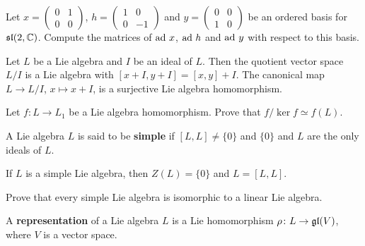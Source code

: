 \begin{exercise}
    Let $x=\begin{pmatrix}
        0&1\\
        0&0\end{pmatrix}$, $h=\begin{pmatrix}
        1&0\\
        0&-1\end{pmatrix}$ and $y=\begin{pmatrix}0&0\\1&0\end{pmatrix}$ 
        be an ordered basis for $\mathfrak{sl}(2,\mathbb{C})$. Compute the matrices
        of $\operatorname{ad}\,x$, $\operatorname{ad}\,h$ and $\operatorname{ad}\,y$ with respect to this basis. 
\end{exercise}

Let $L$ be a Lie algebra and $I$ be an ideal of $L$. Then 
the quotient vector space $L/I$ is a Lie algebra
with $[x+I,y+I]=[x,y]+I$. The canonical map 
$L\to L/I$, $x\mapsto x+I$, 
is a surjective Lie algebra homomorphism. 

\begin{exercise}
    Let $f\colon L\to L_1$ be a Lie algebra homomorphism.
    Prove that $f/\ker f\simeq f(L)$. 
\end{exercise}

\begin{definition}
    A Lie algebra $L$ is said to be \textbf{simple} if 
    $[L,L]\ne\{0\}$ and $\{0\}$ and $L$ are the only ideals of $L$. 
\end{definition}

If $L$ is a simple Lie algebra, then $Z(L)=\{0\}$ and $L=[L,L]$. 

\begin{exercise}
    Prove that every simple Lie algebra is isomorphic to 
    a linear Lie algebra. 
\end{exercise}


\begin{definition}
    A \textbf{representation} of a Lie algebra $L$ 
    is a Lie homomorphism $\rho\colon L\to\mathfrak{gl}(V)$, where $V$ is a vector space. 
\end{definition}


